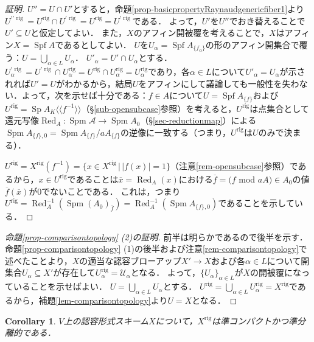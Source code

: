\documentclass[a4paper,12pt, dvipdfmx]{jsbook}
\def\ovl#1{\overline{#1}}%
\def\Red{\mathop{\mathrm{Red}}\nolimits}
\def\rig{\mathop{\mathrm{rig}}\nolimits}
\def\Spf{\mathop{\mathrm{Spf}}\nolimits}
\def\Spm{\mathop{\mathrm{Spm}}\nolimits}
\def\Sp{\mathop{\mathrm{Sp}}\nolimits}
\def\dl{\langle\!\langle}
\def\dr{\rangle\!\rangle}
\newcommand{\abs}[1]{\lvert#1\rvert}
\theoremstyle{plain}
\newtheorem{cor}[thm]{\bfseries Corollary}
\theoremstyle{definition}
\begin{document}
\begin{proof}[証明]
$U''=U\cap U'$とすると，命題\ref{prop-basicpropertyRaynaudgenericfiber1}より$U^{\prime\prime\rig}=U^{\rig}\cap U^{\prime\rig}=U^{\rig}=U^{\prime\rig}$である．
よって，$U'$を$U''$でおき替えることで$U'\subseteq U$と仮定してよい．
また，$X$のアフィン開被覆を考えることで，$X$はアフィン$X=\Spf A$であるとしてよい．
$U$を$U_{\alpha}=\Spf A_{\{f_{\alpha}\}}$の形のアフィン開集合で覆う：$U=\bigcup_{\alpha\in L}U_{\alpha}$．
$U'_{\alpha}=U'\cap U_{\alpha}$とする．
$U^{\prime\rig}_{\alpha}=U^{\prime\rig}\cap U^{\rig}_{\alpha}=U^{\rig}\cap U^{\rig}_{\alpha}=U^{\rig}_{\alpha}$であり，各$\alpha\in L$について$U'_{\alpha}=U_{\alpha}$が示されれば$U'=U$がわかるから，結局$U$をアフィンにして議論しても一般性を失わない．よって，次を示せば十分である：$f\in A$について$U=\Spf A_{\{f\}}$および$U^{\rig}=\Sp A_K\dl f^{-1}\dr$（\S\ref{sub-opensubcase}参照）を考えると，$U^{\rig}$は点集合として還元写像$\Red_A\colon\Spm\mathcal{A}\rightarrow\Spm A_0$（\S\ref{sec-reductionmap}）による$\Spm A_{\{f\},0}=\Spm A_{\{f\}}/aA_{\{f\}}$の逆像に一致する（つまり，$U^{\rig}$は$U$のみで決まる）．

$U^{\rig}=X^{\rig}(f^{-1})=\{x\in X^{\rig}\,|\,\abs{f(x)}=1\}$（注意\ref{rem-opensubcase}参照）であるから，$x\in U^{\rig}$であることは$\ovl{x}=\Red_A(x)$における$\ovl{f}=(f$ mod $aA)\in A_0$の値$\ovl{f}(\ovl{x})$が$0$でないことである．
これは，つまり$U^{\rig}=\Red^{-1}_A(\Spm (A_0)_{\ovl{f}})=\Red^{-1}_A(\Spm A_{\{f\},0})$であることを示している．
\end{proof}

\begin{proof}[{\rm 命題\ref{prop-comparisontopology} (2)の証明}]
前半は明らかであるので後半を示す．
命題\ref{prop-comparisontopology} (1)の後半および注意\ref{rem-comparisontopology}で述べたことより，$X$の適当な認容ブローアップ$X'\rightarrow X$および各$\alpha\in L$について開集合$U_{\alpha}\subseteq X'$が存在して$U^{\rig}_{\alpha}=\mathcal{U}_{\alpha}$となる．
よって，$\{U_{\alpha}\}_{\alpha\in L}$が$X$の開被覆になっていることを示せばよい．
$U=\bigcup_{\alpha\in L}U_{\alpha}$とする．
$U^{\rig}=\bigcup_{\alpha\in L}U^{\rig}_{\alpha}=X^{\rig}$であるから，補題\ref{lem-comparisontopology}より$U=X$となる．
\end{proof}

\begin{cor}\label{cor-comparisontopology}{\rm 
$V$上の認容形式スキーム$X$について，$X^{\rig}$は準コンパクトかつ準分離的である．}
\end{cor}
\end{document}
